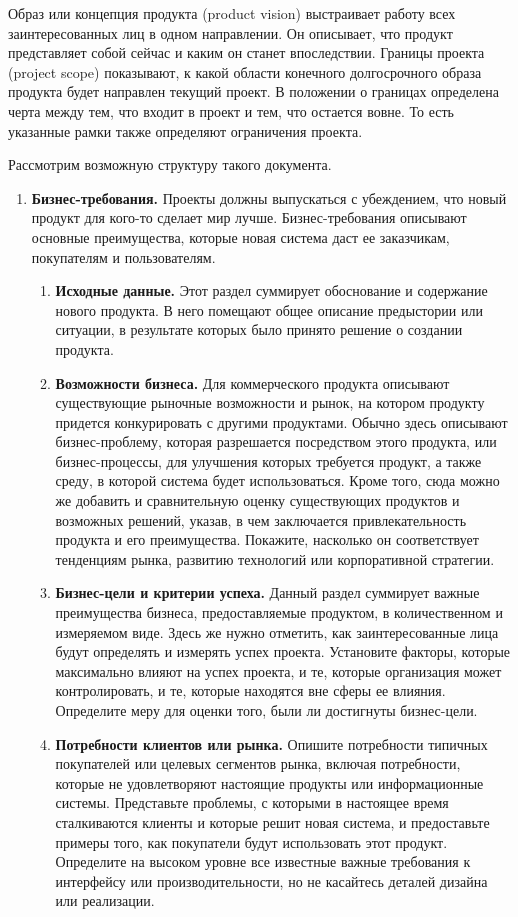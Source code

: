 \documentclass{../../text-style}
\begin{document}
Образ или концепция продукта (product vision) выстраивает работу всех заинтересованных лиц в одном направлении. Он описывает, что продукт представляет собой сейчас и каким он станет впоследствии. Границы проекта (project scope) показывают, к какой области конечного долгосрочного образа продукта будет направлен текущий проект. В положении о границах определена черта между тем, что входит в проект и тем, что остается вовне. То есть указанные рамки также определяют ограничения проекта. 

Рассмотрим возможную структуру такого документа.

\begin{enumerate}
    \item \textbf{Бизнес-требования.} Проекты должны выпускаться с убеждением, что новый продукт для кого-то сделает мир лучше. Бизнес-требования описывают основные преимущества, которые новая система даст ее заказчикам, покупателям и пользователям.
    \begin{enumerate}
        \item \textbf{Исходные данные.} Этот раздел суммирует обоснование и содержание нового продукта. В него помещают общее описание предыстории или ситуации, в результате которых было принято решение о создании продукта.
        \item \textbf{Возможности бизнеса.} Для коммерческого продукта описывают существующие рыночные возможности и рынок, на котором продукту придется конкурировать с другими продуктами. Обычно здесь описывают бизнес-проблему, которая разрешается посредством этого продукта, или бизнес-процессы, для улучшения которых требуется продукт, а также среду, в которой система будет использоваться. Кроме того, сюда можно же добавить и сравнительную оценку существующих продуктов и возможных решений, указав, в чем заключается привлекательность продукта и его преимущества. Покажите, насколько он соответствует тенденциям рынка, развитию технологий или корпоративной стратегии.
        \item \textbf{Бизнес-цели и критерии успеха.} Данный раздел суммирует важные преимущества бизнеса, предоставляемые продуктом, в количественном и измеряемом виде. Здесь же нужно отметить, как заинтересованные лица будут определять и измерять успех проекта. Установите факторы, которые максимально влияют на успех проекта, и те, которые организация может контролировать, и те, которые находятся вне сферы ее влияния. Определите меру для оценки того, были ли достигнуты бизнес-цели.
        \item \textbf{Потребности клиентов или рынка.} Опишите потребности типичных покупателей или целевых сегментов рынка, включая потребности, которые не удовлетворяют настоящие продукты или информационные системы. Представьте проблемы, с которыми в настоящее время сталкиваются клиенты и которые решит новая система, и предоставьте примеры того, как покупатели будут использовать этот продукт. Определите на высоком уровне все известные важные требования к интерфейсу или производительности, но не касайтесь деталей дизайна или реализации.

\end{enumerate}
\end{enumerate}
\end{document}

